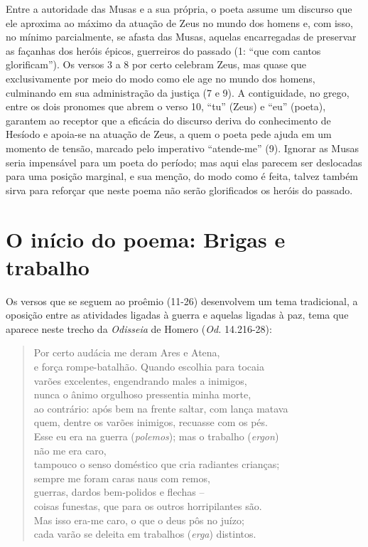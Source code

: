 Entre a autoridade das Musas e a sua própria, o poeta assume um discurso
que ele aproxima ao máximo da atuação de Zeus no mundo dos homens e, com
isso, no mínimo parcialmente, se afasta das Musas, aquelas encarregadas
de preservar as façanhas dos heróis épicos, guerreiros do passado (1:
``que com cantos glorificam''). Os versos 3 a 8 por certo celebram Zeus,
mas quase que exclusivamente por meio do modo como ele age no mundo dos
homens, culminando em sua administração da justiça (7 e 9). A
contiguidade, no grego, entre os dois pronomes que abrem o verso 10,
``tu'' (Zeus) e ``eu'' (poeta), garantem ao receptor que a eficácia do
discurso deriva do conhecimento de Hesíodo e apoia-se na atuação de
Zeus, a quem o poeta pede ajuda em um momento de tensão, marcado pelo
imperativo ``atende-me'' (9). Ignorar as Musas seria impensável para um
poeta do período; mas aqui elas parecem ser deslocadas para uma posição
marginal, e sua menção, do modo como é feita, talvez também sirva para
reforçar que neste poema não serão glorificados os heróis do passado.

\section{O início do poema: Brigas e trabalho}

Os versos que se seguem ao proêmio (11-26) desenvolvem um tema
tradicional, a oposição entre as atividades ligadas à guerra e aquelas
ligadas à paz, tema que aparece neste trecho da \emph{Odisseia} de
Homero (\emph{Od.} 14.216-28):

\begin{verse}
Por certo audácia me deram Ares e Atena,\\
e força rompe-batalhão. Quando escolhia para tocaia\\
varões excelentes, engendrando males a inimigos,\\
nunca o ânimo orgulhoso pressentia minha morte,\\
ao contrário: após bem na frente saltar, com lança matava\\
quem, dentre os varões inimigos, recuasse com os pés.\\
Esse eu era na guerra (\emph{polemos}); mas o trabalho (\emph{ergon})\\
não me era caro,\\
tampouco o senso doméstico que cria radiantes crianças;\\
sempre me foram caras naus com remos,\\
guerras, dardos bem-polidos e flechas --\\
coisas funestas, que para os outros horripilantes são.\\
Mas isso era-me caro, o que o deus pôs no juízo;\\
cada varão se deleita em trabalhos (\emph{erga}) distintos.
\end{verse}

